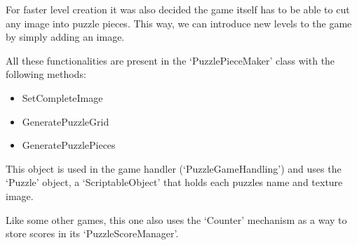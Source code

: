For faster level creation it was also decided the game itself has to be able to cut any image into puzzle pieces. This way, we can introduce new levels to the game by simply adding an image.

All these functionalities are present in the `PuzzlePieceMaker' class with the following methods:

\begin{itemize}
    \item SetCompleteImage
    \item GeneratePuzzleGrid
    \item GeneratePuzzlePieces
\end{itemize}

This object is used in the game handler (`PuzzleGameHandling') and uses the `Puzzle' object, a `ScriptableObject' that holds each puzzles name and texture image.

Like some other games, this one also uses the `Counter' mechanism as a way to store scores in its `PuzzleScoreManager'.

